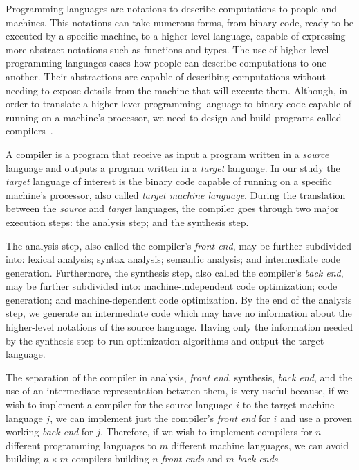 \documentclass[english, lmodern, oneside, nopageanchorhack]{ufsc-thesis-rn46-2019}
\begin{document}
Programming languages are notations to describe computations to people and machines.
This notations can take numerous forms, from binary code, ready to be executed by a specific machine, to a higher-level language, capable of expressing more abstract notations such as functions and types.
The use of higher-level programming languages eases how people can describe computations to one another.
Their abstractions are capable of describing computations without needing to expose details from the machine that will execute them.
Although, in order to translate a higher-lever programming language to binary code capable of running on a machine's processor, we need to design and build programs called compilers~\cite{Aho:2006:CPT:1177220}.

A compiler is a program that receive as input a program written in a \textit{source} language and outputs a program written in a \textit{target} language.
In our study the \textit{target} language of interest is the binary code capable of running on a specific machine's processor, also called \textit{target machine language}.
During the translation between the \textit{source} and \textit{target} languages, the compiler goes through two major execution steps: the analysis step; and the synthesis step.

The analysis step, also called the compiler's \textit{front end}, may be further subdivided into: lexical analysis; syntax analysis; semantic analysis; and intermediate code generation.
Furthermore, the synthesis step, also called the compiler's \textit{back end}, may be further subdivided into: machine-independent code optimization; code generation; and machine-dependent code optimization.
By the end of the analysis step, we generate an intermediate code which may have no information about the higher-level notations of the source language.
Having only the information needed by the synthesis step to run optimization algorithms and output the target language.

The separation of the compiler in analysis, \textit{front end}, synthesis, \textit{back end}, and the use of an intermediate representation between them, is very useful because, if we wish to implement a compiler for the source language $i$ to the target machine language $j$, we can implement just the compiler's \textit{front end} for $i$ and use a proven working \textit{back end} for $j$.
Therefore, if we wish to implement compilers for $n$ different programming languages to $m$ different machine languages, we can avoid building $n \times m$ compilers building $n$ \textit{front ends} and $m$ \textit{back ends}.
\end{document}
